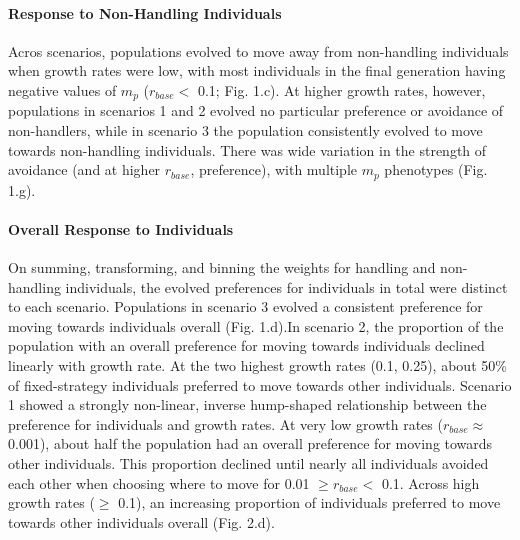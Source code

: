 \documentclass[11pt]{article}
\begin{document}
\paragraph{Response to Non-Handling Individuals}

Acros scenarios, populations evolved to move away from non-handling individuals when growth rates were low, with most individuals in the final generation having negative values of $m_p$ ($r_{base} <$ 0.1; Fig. 1.c).
At higher growth rates, however, populations in scenarios 1 and 2 evolved no particular preference or avoidance of non-handlers, while in scenario 3 the population consistently evolved to move towards non-handling individuals.
There was wide variation in the strength of avoidance (and at higher $r_{base}$, preference), with multiple $m_p$ phenotypes (Fig. 1.g).

\paragraph*{Overall Response to Individuals}

On summing, transforming, and binning the weights for handling and non-handling individuals, the evolved preferences for individuals in total were distinct to each scenario.
Populations in scenario 3 evolved a consistent preference for moving towards individuals overall (Fig. 1.d).In scenario 2, the proportion of the population with an overall preference for moving towards individuals declined linearly with growth rate.
At the two highest growth rates (0.1, 0.25), about 50\% of fixed-strategy individuals preferred to move towards other individuals.
Scenario 1 showed a strongly non-linear, inverse hump-shaped relationship between the preference for individuals and growth rates.
At very low growth rates ($r_{base} \approx$ 0.001), about half the population had an overall preference for moving towards other individuals.
This proportion declined until nearly all individuals avoided each other when choosing where to move for  0.01 $\geq r_{base} <$ 0.1.
Across high growth rates ($\geq$ 0.1), an increasing proportion of individuals preferred to move towards other individuals overall (Fig. 2.d).
\end{document}

